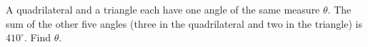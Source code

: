 A quadrilateral and a triangle each have one angle of the same measure $\theta$. The sum of the other five angles (three in the quadrilateral and two in the triangle) is $410^\circ$. Find $\theta$.
